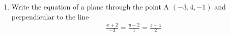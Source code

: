 \renewcommand{\theequation}{\theenumi}
\renewcommand{\thefigure}{\theenumi}
\begin{enumerate}[label=\thesubsection.\arabic*.,ref=\thesubsection.\theenumi]
%

\item Write the equation of a plane through the point A $\left(-3, 4, -1 \right)$ and perpendicular to the line 
\begin{align}
\frac{x+2}{-3} = \frac{y - 2}{1} = \frac{z-4}{2} \label{eq:solutions/4/50/3/eq1.1}
\end{align}
%
\solution

%
\end{enumerate}


